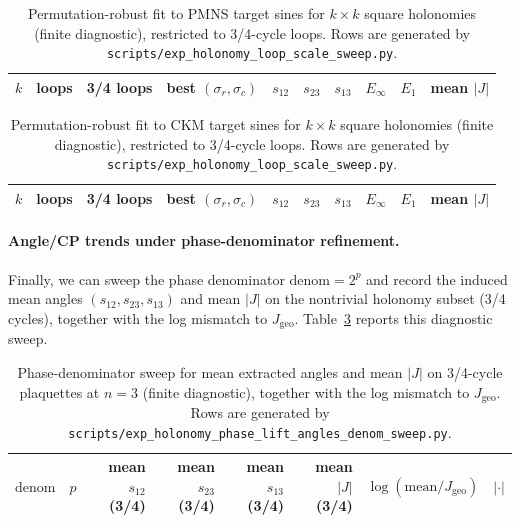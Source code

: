 \begin{table}[t]
\centering
\scriptsize
\setlength{\tabcolsep}{4pt}
\renewcommand{\arraystretch}{1.15}
\begin{tabular}{rrrrrrrrrr}
\toprule
$k$ & loops & 3/4 loops & best $(\sigma_r,\sigma_c)$ & $s_{12}$ & $s_{23}$ & $s_{13}$ & $E_\infty$ & $E_1$ & mean $|J|$ \\
\midrule
%
\end{tabular}
\caption{Permutation-robust fit to PMNS target sines for $k\times k$ square holonomies (finite diagnostic), restricted to 3/4-cycle loops. Rows are generated by \texttt{scripts/exp\_holonomy\_loop\_scale\_sweep.py}.}
\label{tab:holonomy_loop_scale_fit_pmns}
\end{table}

\begin{table}[t]
\centering
\scriptsize
\setlength{\tabcolsep}{4pt}
\renewcommand{\arraystretch}{1.15}
\begin{tabular}{rrrrrrrrrr}
\toprule
$k$ & loops & 3/4 loops & best $(\sigma_r,\sigma_c)$ & $s_{12}$ & $s_{23}$ & $s_{13}$ & $E_\infty$ & $E_1$ & mean $|J|$ \\
\midrule
%
\end{tabular}
\caption{Permutation-robust fit to CKM target sines for $k\times k$ square holonomies (finite diagnostic), restricted to 3/4-cycle loops. Rows are generated by \texttt{scripts/exp\_holonomy\_loop\_scale\_sweep.py}.}
\label{tab:holonomy_loop_scale_fit_ckm}
\end{table}

\paragraph{Angle/CP trends under phase-denominator refinement.}
Finally, we can sweep the phase denominator $\mathrm{denom}=2^p$ and record the induced mean angles $(s_{12},s_{23},s_{13})$ and mean $|J|$ on the nontrivial holonomy subset (3/4 cycles), together with the log mismatch to $J_{\mathrm{geo}}$.
Table~\ref{tab:holonomy_phase_lift_angles_denom_sweep} reports this diagnostic sweep.

\begin{table}[t]
\centering
\scriptsize
\setlength{\tabcolsep}{6pt}
\renewcommand{\arraystretch}{1.15}
\begin{tabular}{rrrrrrrr}
\toprule
$\mathrm{denom}$ & $p$ & mean $s_{12}$ (3/4) & mean $s_{23}$ (3/4) & mean $s_{13}$ (3/4) & mean $|J|$ (3/4) & $\log(\mathrm{mean}/J_{\mathrm{geo}})$ & $|\cdot|$ \\
\midrule
%
\end{tabular}
\caption{Phase-denominator sweep for mean extracted angles and mean $|J|$ on 3/4-cycle plaquettes at $n=3$ (finite diagnostic), together with the log mismatch to $J_{\mathrm{geo}}$. Rows are generated by \texttt{scripts/exp\_holonomy\_phase\_lift\_angles\_denom\_sweep.py}.}
\label{tab:holonomy_phase_lift_angles_denom_sweep}
\end{table}

